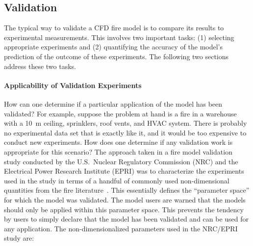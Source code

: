 \documentclass[graybox]{svmult}
\begin{document}
\subsection{Validation}

The typical way to validate a CFD fire model is to compare its results to experimental measurements. This involves two important tasks: (1) selecting appropriate experiments and (2) quantifying the accuracy of the model's prediction of the outcome of these experiments. The following two sections address these two tasks.

\paragraph{Applicability of Validation Experiments}

How can one determine if a particular application of the model has been validated? For example, suppose the problem at hand is a fire in a warehouse with a 10~m ceiling, sprinklers, roof vents, and HVAC system. There is probably no experimental data set that is exactly like it, and it would be too expensive to conduct new experiments. How does one determine if any validation work is appropriate for this scenario? The approach taken in a fire model validation study conducted by the U.S.~Nuclear Regulatory Commission (NRC) and the Electrical Power Research Institute (EPRI) was to characterize the experiments used in the study in terms of a handful of commonly used non-dimensional quantities from the fire literature~\cite{Hill:2007}. This essentially defines the ``parameter space'' for which the model was validated. The model users are warned that the models should only be applied within this parameter space. This prevents the tendency by users to simply declare that the model has been validated and can be used for any application. The non-dimensionalized parameters used in the NRC/EPRI study are:
\end{document}
